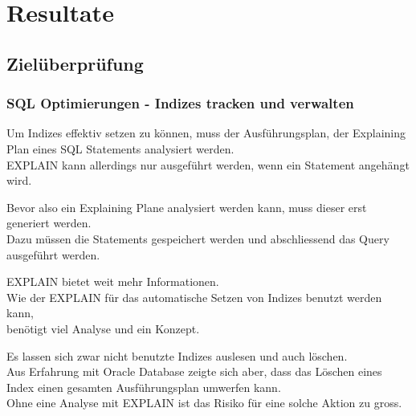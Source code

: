 
\clearpage
{}
\recalctypearea
\chapter{Resultate}
\section{Zielüberprüfung}

\clearpage
{}
\recalctypearea
\begin{flushleft}
    \subsection{SQL Optimierungen - Indizes tracken und verwalten}
    Um Indizes effektiv setzen zu können, muss der Ausführungsplan, der Explaining Plan eines SQL Statements analysiert werden.\\
    EXPLAIN kann allerdings nur ausgeführt werden, wenn ein Statement angehängt wird\cite{A4Y646W7}.\\
\end{flushleft}
\begin{flushleft}
    Bevor also ein Explaining Plane analysiert werden kann, muss dieser erst generiert werden.\\
    Dazu müssen die Statements gespeichert werden und abschliessend das Query ausgeführt werden.
\end{flushleft}
\begin{flushleft}
    EXPLAIN bietet weit mehr Informationen.\\
    Wie der EXPLAIN für das automatische Setzen von Indizes benutzt werden kann,\\
    benötigt viel Analyse und ein Konzept.
\end{flushleft}
\begin{flushleft}
    Es lassen sich zwar nicht benutzte Indizes auslesen und auch löschen.\\
    Aus Erfahrung mit \Gls{Oracle Database} zeigte sich aber, dass das Löschen eines Index einen gesamten Ausführungsplan umwerfen kann.\\
    Ohne eine Analyse mit EXPLAIN ist das Risiko für eine solche Aktion zu gross.
\end{flushleft}
